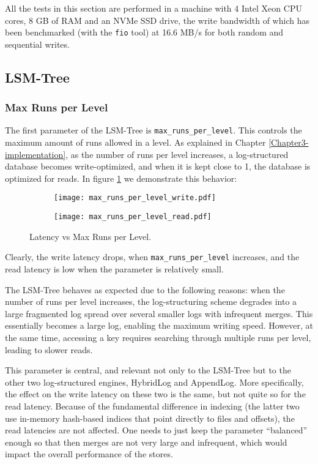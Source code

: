 All the tests in this section are performed in a machine with 4 Intel Xeon CPU cores, 8 GB of RAM and an NVMe SSD drive, the write bandwidth of which has been benchmarked (with the \verb|fio| tool) at 16.6 MB/s for both random and sequential writes.

\subsection{LSM-Tree}

\subsubsection{Max Runs per Level}

The first parameter of the LSM-Tree is \verb"max_runs_per_level". This controls the maximum amount of runs allowed in a level. As explained in Chapter \ref{Chapter3-implementation}, as the number of runs per level increases, a log-structured database becomes write-optimized, and when it is kept close to 1, the database is optimized for reads. In figure \ref{fig:max-runs-per-level} we demonstrate this behavior:

\begin{figure}[h]
    \begin{subfigure}{.5\textwidth}
        \centering
        \texttt{[image: max\_runs\_per\_level\_write.pdf]}
    \end{subfigure}
    \begin{subfigure}{.5\textwidth}
        \centering
        \texttt{[image: max\_runs\_per\_level\_read.pdf]}
    \end{subfigure}
    \caption{Latency vs Max Runs per Level.}
    \label{fig:max-runs-per-level}
\end{figure}

Clearly, the write latency drops, when \verb"max_runs_per_level" increases, and the read latency is low when the parameter is relatively small.

The LSM-Tree behaves as expected due to the following reasons: when the number of runs per level increases, the log-structuring scheme degrades into a large fragmented log spread over several smaller logs with infrequent merges. This essentially becomes a large log, enabling the maximum writing speed. However, at the same time, accessing a key requires searching through multiple runs per level, leading to slower reads.

This parameter is central, and relevant not only to the LSM-Tree but to the other two log-structured engines, HybridLog and AppendLog. More specifically, the effect on the write latency on these two is the same, but not quite so for the read latency. Because of the fundamental difference in indexing (the latter two use in-memory hash-based indices that point directly to files and offsets), the read latencies are not affected. One needs to just keep the parameter ``balanced'' enough so that then merges are not very large and infrequent, which would impact the overall performance of the stores.

